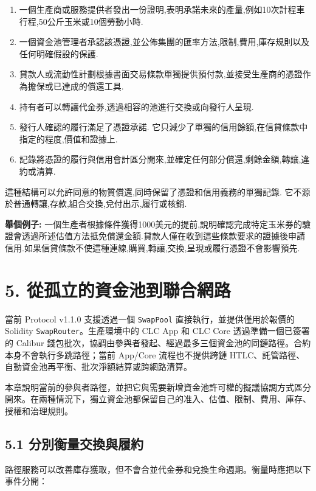 \documentclass[11pt]{article}
\begin{document}
\begin{enumerate}[leftmargin=*]
\item 一個生產商或服務提供者發出一份證明,表明承諾未來的產量,例如10次計程車行程,50公斤玉米或10個勞動小時.
\item 一個資金池管理者承認該憑證,並公佈集團的匯率方法,限制,費用,庫存規則以及任何明確假設的保護.
\item 貸款人或流動性計劃根據書面交易條款單獨提供預付款,並接受生產商的憑證作為擔保或已達成的償還工具.
\item 持有者可以轉讓代金券,透過相容的池進行交換或向發行人呈現.
\item 發行人確認的履行滿足了憑證承諾. 它只減少了單獨的信用餘額,在信貸條款中指定的程度,價值和證據上.
\item 記錄將憑證的履行與信用會計區分開來,並確定任何部分償還,剩餘金額,轉讓,違約或清算.
\end{enumerate}
這種結構可以允許同意的物質償還,同時保留了憑證和信用義務的單獨記錄. 它不源於普通轉讓,存款,組合交換,兌付出示,履行或核銷.

\textbf{舉個例子:} 一個生產者根據條件獲得1000美元的提前,說明確認完成特定玉米券的驗證會透過所述估值方法抵免償還金額.貸款人僅在收到這些條款要求的證據後申請信用.如果信貸條款不使這種連線,購買,轉讓,交換,呈現或履行憑證不會影響預先.


\section*{5. 從孤立的資金池到聯合網路}

當前 Protocol v1.1.0 支援透過一個 \texttt{SwapPool} 直接執行，並提供僅用於報價的 Solidity \texttt{SwapRouter}。生產環境中的 CLC App 和 CLC Core 透過準備一個已簽署的 Calibur 錢包批次，協調由參與者發起、經過最多三個資金池的同鏈路徑。合約本身不會執行多跳路徑；當前 App/Core 流程也不提供跨鏈 HTLC、託管路徑、自動資金池再平衡、批次淨額結算或跨網路清算。

本章說明當前的參與者路徑，並把它與需要新增資金池許可權的擬議協調方式區分開來。在兩種情況下，獨立資金池都保留自己的准入、估值、限制、費用、庫存、授權和治理規則。

\subsection*{5.1 分別衡量交換與履約}

路徑服務可以改善庫存獲取，但不會合並代金券和兌換生命週期。衡量時應把以下事件分開：
\end{document}
